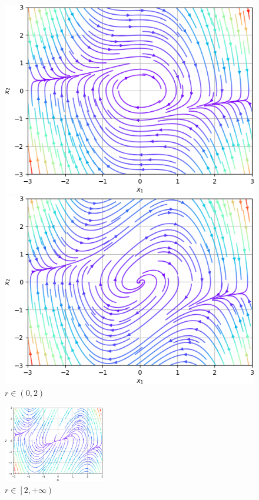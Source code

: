 \documentclass[a4paper]{article}
\begin{document}
\begin{figure}[H]
    \centering
    \begin{minipage}{0.395\textwidth}
        \includegraphics[width=\textwidth]{sources/r=0.png}
        \caption{$r = 0$}
    \end{minipage}
    \hspace{2em}
    \begin{minipage}{0.395\textwidth}
        \includegraphics[width=\textwidth]{sources/0<r<2.png}
        \caption{$r \in \left( 0, 2\right)$}
    \end{minipage}
\end{figure}
\begin{figure}[H]
    \centering
    \includegraphics[width=0.395\textwidth]{sources/r>=2.png}
    \caption{$r \in \left[ 2, +\infty\right)$}
\end{figure}
\end{document}
